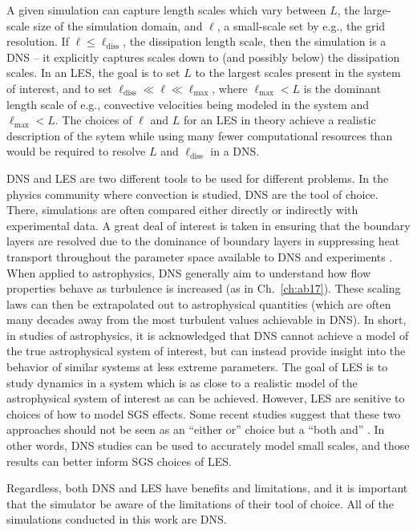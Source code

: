 A given simulation can capture length scales which vary between $L$, the large-scale size of the simulation domain, and $\ell$, a small-scale set by e.g., the grid resolution.
If $\ell \leq \ell_{\text{diss}}$, the dissipation length scale, then the simulation is a DNS -- it explicitly captures scales down to (and possibly below) the dissipation scales.
In an LES, the goal is to set $L$ to the largest scales present in the system of interest, and to set $\ell_{\text{diss}} \ll \ell \ll \ell_{\text{max}}$, where $\ell_{\text{max}} < L$ is the dominant length scale of e.g., convective velocities being modeled in the system and $\ell_{\text{max}} < L$.
The choices of $\ell$ and $L$ for an LES in theory achieve a realistic description of the sytem while using many fewer computational resources than would be required to resolve $L$ and $\ell_{\text{diss}}$ in a DNS.

DNS and LES are two different tools to be used for different problems.
In the physics community where \RB convection is studied, DNS are the tool of choice.
There, simulations are often compared either directly or indirectly with experimental data.
A great deal of interest is taken in ensuring that the boundary layers are resolved \citep{shishkina&all2010} due to the dominance of boundary layers in suppressing heat transport throughout the parameter space available to DNS and experiments \citep{ahlers&all2009}.
When applied to astrophysics, DNS generally aim to understand how flow properties behave as turbulence is increased (as in Ch.~\ref{ch:ab17}).
These scaling laws can then be extrapolated out to astrophysical quantities (which are often many decades away from the most turbulent values achievable in DNS).
In short, in studies of astrophysics, it is acknowledged that DNS cannot achieve a model of the true astrophysical system of interest, but can instead provide insight into the behavior of similar systems at less extreme parameters.
The goal of LES is to study dynamics in a system which is as close to a realistic model of the astrophysical system of interest as can be achieved.
However, LES are senitive to choices of how to model SGS effects.
Some recent studies suggest that these two approaches should not be seen as an ``either or'' choice but a ``both and'' \citep{mellado&all2018}.
In other words, DNS studies can be used to accurately model small scales, and those results can better inform SGS choices of LES.

Regardless, both DNS and LES have benefits and limitations, and it is important that the simulator be aware of the limitations of their tool of choice.
All of the simulations conducted in this work are DNS.

